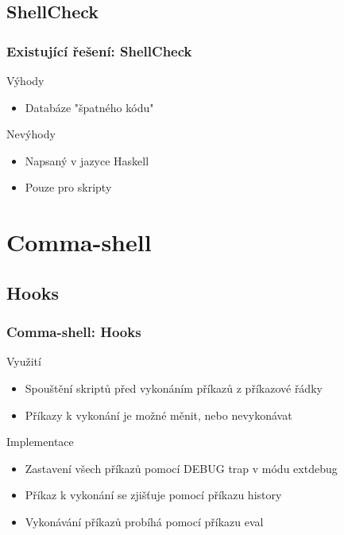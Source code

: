 \documentclass{beamer}
\begin{document}
\subsection{ShellCheck}
\begin{frame}
	\frametitle{Existující řešení: ShellCheck}
	\begin{exampleblock}{Výhody}
		\begin{itemize}
			\item Databáze "špatného kódu"
		\end{itemize}
	\end{exampleblock}
	\begin{alertblock}{Nevýhody}
		\begin{itemize}
			\item Napsaný v jazyce Haskell
			\item Pouze pro skripty
		\end{itemize}
	\end{alertblock}
\end{frame}


\section{Comma-shell}


\subsection{Hooks}
\begin{frame}
	\frametitle{Comma-shell: Hooks}
	
	\begin{exampleblock}{Využití}
		\begin{itemize}
			\item Spouštění skriptů před vykonáním příkazů z příkazové řádky
			\item Příkazy k vykonání je možné měnit, nebo nevykonávat
		\end{itemize}
	\end{exampleblock}	
	
	\begin{exampleblock}{Implementace}
		\begin{itemize}
			\item Zastavení všech příkazů pomocí DEBUG trap v módu extdebug
			\item Příkaz k vykonání se zjišťuje pomocí příkazu history
			\item Vykonávání příkazů probíhá pomocí příkazu eval
		\end{itemize}
	\end{exampleblock}
\end{frame}
\end{document}

